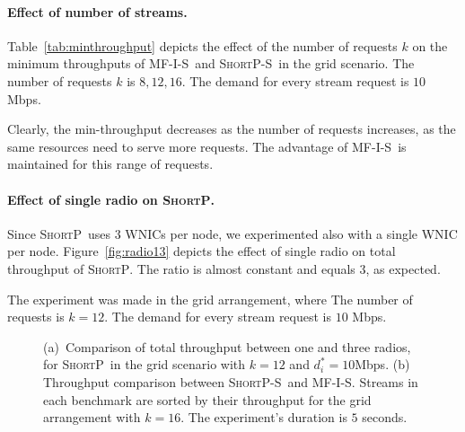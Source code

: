 \documentclass[12pt]{article}
\newenvironment{proof sketch}[1]{\noindent {\emph{Proof sketch of #1:}}}{\hfill \qed}
\newcommand{\algA}{\textsc{MF-I-S}}
\newcommand{\algB}{\textsc{ShortP}}
\newcommand{\algBS}{\textsc{ShortP-S}}
\newcommand{\algS}{\algB}
\begin{document}
\paragraph{Effect of number of streams.}
Table~\ref{tab:minthroughput} depicts the effect of the number of
requests $k$  on the minimum throughputs of \algA\ and \algBS\ in the
grid scenario.  The number of requests $k$ is $8,12,16$. The demand
for every stream request is $10$ Mbps.

Clearly, the min-throughput decreases as the number of requests
increases, as the same resources need to serve more requests.
The advantage of \algA\ is maintained for this range of requests.


\paragraph{Effect of single radio on \algS.}
Since \algS\ uses $3$ WNICs per node, we experimented also with a single WNIC per node.
Figure~\ref{fig:radio13} depicts the effect of single radio on total throughput of \algS.
The ratio is almost constant and equals $3$, as expected.

The experiment was made in the grid arrangement, where The number of requests is $k=12$.
The demand for every stream request is $10$ Mbps.

\begin{figure}%
      \centering
          \caption{ (a)~Comparison of total throughput between one and three radios, for \algS\ in the grid
          scenario with $k=12$ and $d^*_i=10$Mbps. (b)~ Throughput comparison between \algBS\ and \algA. Streams in each benchmark are sorted by their
          throughput for the grid arrangement with $k=16$. The experiment's duration is $5$ seconds. }
     \end{figure}
\end{document}
